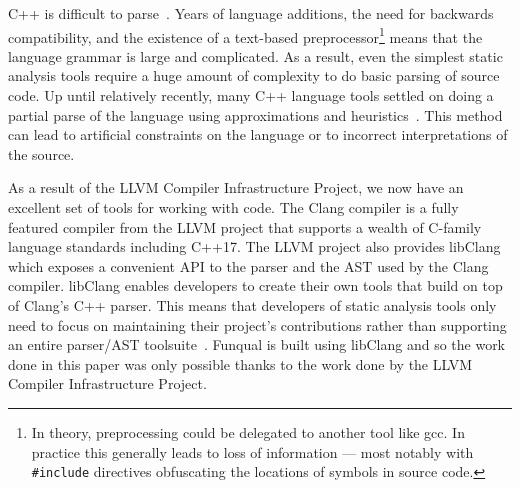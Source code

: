 C++ is difficult to parse~\cite{cpp-sucks, libclang-survey, mozilla-pork, parse-cpp}.  Years of language additions, the need for backwards compatibility, and the existence of a text-based preprocessor\footnote{In theory, preprocessing could be delegated to another tool like gcc.  In practice this generally leads to loss of information --- most notably with \lstinline{#include} directives obfuscating the locations of symbols in source code.} means that the language grammar is large and complicated.  As a result, even the simplest static analysis tools require a huge amount of complexity to do basic parsing of source code.  Up until relatively recently, many C++ language tools settled on doing a partial parse of the language using approximations and heuristics~\cite{libclang-survey}.  This method can lead to artificial constraints on the language or to incorrect interpretations of the source.  

As a result of the LLVM Compiler Infrastructure Project, we now have an excellent set of tools for working with code.  The Clang compiler is a fully featured compiler from the LLVM project that supports a wealth of C-family language standards including C++17.  The LLVM project also provides libClang which exposes a convenient API to the parser and the AST used by the Clang compiler.  libClang enables developers to create their own tools that build on top of Clang's C++ parser.  This means that developers of static analysis tools only need to focus on maintaining their project's contributions rather than supporting an entire parser/AST toolsuite~\cite{libclang-survey}.  Funqual is built using libClang and so the work done in this paper was only possible thanks to the work done by the LLVM Compiler Infrastructure Project.  
